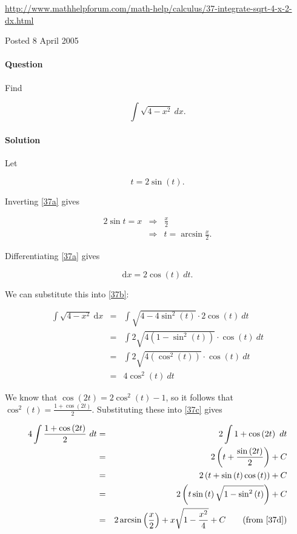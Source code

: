\url{http://www.mathhelpforum.com/math-help/calculus/37-integrate-sqrt-4-x-2-dx.html}

Posted 8 April 2005

\paragraph{Question} Find

\begin{equation}
	\int\sqrt{4-x^2}~dx.\label{37b}
\end{equation}

\paragraph{Solution} 

Let

\begin{equation}
	t=2\sin\left(t\right)\label{37a}.
\end{equation}

Inverting \ref{37a} gives

\begin{eqnarray}
	2\sin t=x&\Rightarrow&\frac{x}{2}\nonumber\\
	&\Rightarrow&t=\arcsin\frac{x}{2}.\label{37d}
\end{eqnarray}

Differentiating \ref{37a} gives

\[\mbox{d}x=2\cos\left(t\right)~dt.\]

We can substitute this into \ref{37b}:

\begin{eqnarray}
	\int\sqrt{4-x^2}~\mbox{d}x&=&\int\sqrt{4-4\sin^2\left(t\right)}\cdot2\cos\left(t\right)~dt\nonumber\\
	&=&\int2\sqrt{4\left(1-\sin^2\left(t\right)\right)}\cdot\cos\left(t\right)~dt\nonumber\\
	&=&\int2\sqrt{4\left(\cos^2\left(t\right)\right)}\cdot\cos\left(t\right)~dt\nonumber\\
	&=&4\cos^2\left(t\right)~dt\label{37c}
\end{eqnarray}

We know that $\cos\left(2t\right)=2\cos^2\left(t\right)-1$, so it follows that $\cos^2\left(t\right)=\frac{1+\cos\left(2t\right)}{2}$. Substituting these into \ref{37c} gives

\begin{eqnarray*}
	4\int\frac{1+\cos\left(2t\right)}{2}~dt&=&2\int1+\cos\left(2t\right)~dt\\
	&=&2\left(t+\frac{\sin\left(2t\right)}{2}\right)+C\\
	&=&2\left(t+\sin\left(t\right)\cos\left(t\right)\right)+C\\
	&=&2\left(t\sin\left(t\right)\sqrt{1-\sin^2\left(t\right)}\right)+C\\
	&=&2\arcsin\left(\frac{x}{2}\right)+x\sqrt{1-\frac{x^2}{4}}+C\qquad\mbox{(from \ref{37d})}
\end{eqnarray*}
